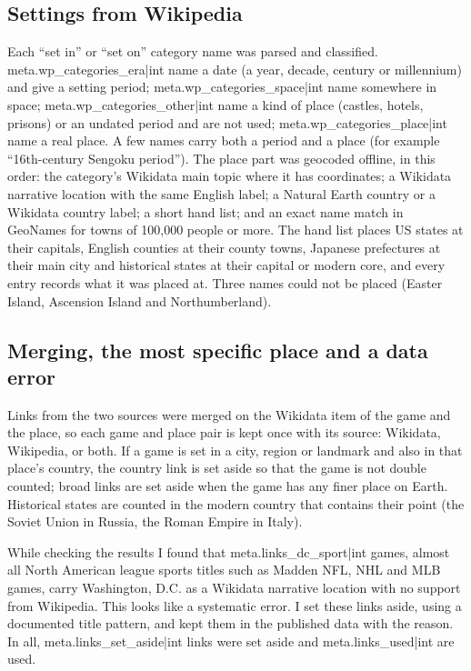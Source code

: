 \documentclass[11pt,a4paper]{article}
\begin{document}
\subsection{Settings from Wikipedia}

Each ``set in'' or ``set on'' category name was parsed and classified. {{meta.wp_categories_era|int}} name a date (a year, decade, century or millennium) and give a setting period; {{meta.wp_categories_space|int}} name somewhere in space; {{meta.wp_categories_other|int}} name a kind of place (castles, hotels, prisons) or an undated period and are not used; {{meta.wp_categories_place|int}} name a real place. A few names carry both a period and a place (for example ``16th-century Sengoku period''). The place part was geocoded offline, in this order: the category's Wikidata main topic where it has coordinates; a Wikidata narrative location with the same English label; a Natural Earth country or a Wikidata country label; a short hand list; and an exact name match in GeoNames for towns of 100,000 people or more. The hand list places US states at their capitals, English counties at their county towns, Japanese prefectures at their main city and historical states at their capital or modern core, and every entry records what it was placed at. Three names could not be placed (Easter Island, Ascension Island and Northumberland).

\subsection{Merging, the most specific place and a data error}

Links from the two sources were merged on the Wikidata item of the game and the place, so each game and place pair is kept once with its source: Wikidata, Wikipedia, or both. If a game is set in a city, region or landmark and also in that place's country, the country link is set aside so that the game is not double counted; broad links are set aside when the game has any finer place on Earth. Historical states are counted in the modern country that contains their point (the Soviet Union in Russia, the Roman Empire in Italy).

While checking the results I found that {{meta.links_dc_sport|int}} games, almost all North American league sports titles such as Madden NFL, NHL and MLB games, carry Washington, D.C. as a Wikidata narrative location with no support from Wikipedia. This looks like a systematic error. I set these links aside, using a documented title pattern, and kept them in the published data with the reason. In all, {{meta.links_set_aside|int}} links were set aside and {{meta.links_used|int}} are used.
\end{document}
